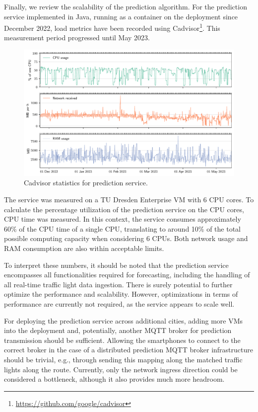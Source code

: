 Finally, we review the scalability of the prediction algorithm. For the prediction service implemented in Java, running as a container on the deployment since December 2022, load metrics have been recorded using Cadvisor\footnote{\url{https://github.com/google/cadvisor}}. This measurement period progressed until May 2023.

\begin{figure}[htbp]
    \centering
    \includegraphics[width=\linewidth]{images/monitoring-prediction-service-load.pdf}
    \caption{Cadvisor statistics for prediction service.}\label{fig:monitoring-prediction-service-load}
\end{figure}

The service was measured on a TU Dresden Enterprise VM with 6 CPU cores. To calculate the percentage utilization of the prediction service on the CPU cores, CPU time was measured. In this context, the service consumes approximately 60\% of the CPU time of a single CPU, translating to around 10\% of the total possible computing capacity when considering 6 CPUs. Both network usage and RAM consumption are also within acceptable limits.

To interpret these numbers, it should be noted that the prediction service encompasses all functionalities required for forecasting, including the handling of all real-time traffic light data ingestion. There is surely potential to further optimize the performance and scalability. However, optimizations in terms of performance are currently not required, as the service appears to scale well. 

For deploying the prediction service across additional cities, adding more VMs into the deployment and, potentially, another MQTT broker for prediction transmission should be sufficient. Allowing the smartphones to connect to the correct broker in the case of a distributed prediction MQTT broker infrastructure should be trivial, e.g., through sending this mapping along the matched traffic lights along the route. Currently, only the network ingress direction could be considered a bottleneck, although it also provides much more headroom.

